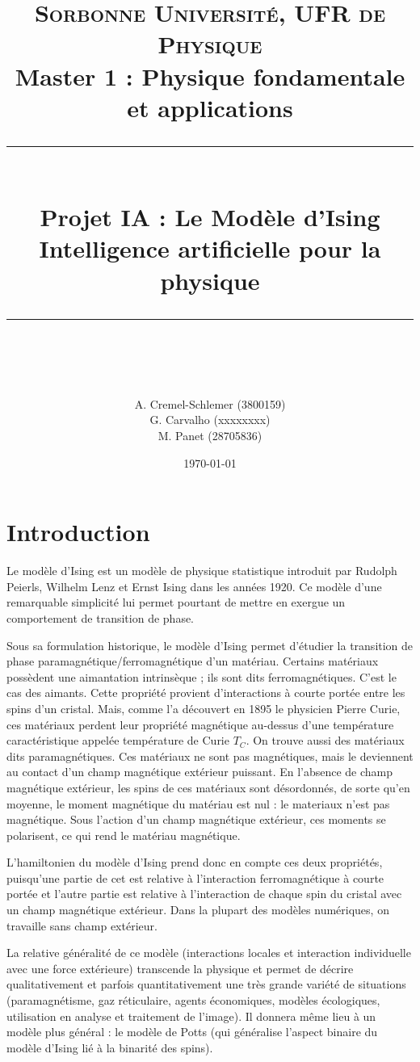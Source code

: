 \documentclass[11pt]{scrartcl} %
\title{	
	\normalfont\normalsize
	\large\textsc{Sorbonne Université, UFR de Physique}\\ %
	\vspace{2pt} %
	\normalsize Master 1 : Physique fondamentale et applications\\
	\vspace{25pt} %
	\rule{\linewidth}{0.5pt}\\ %
	\vspace{20pt} %
	{\huge Projet IA : Le Modèle d'Ising}\\ %
	\vspace{2pt} %
	{Intelligence artificielle pour la physique}\\
	\vspace{12pt} %
	\rule{\linewidth}{2pt}\\ %
	\vspace{12pt} %
}
\author{\LARGE A. Cremel-Schlemer \large (3800159) \\ \LARGE G. Carvalho \large (xxxxxxxx) \\ \LARGE M. Panet \large (28705836)} %
\date{\normalsize\today} %
\begin{document}
\maketitle %
\tableofcontents %

\newpage

\section*{Introduction}

Le modèle d'Ising est un modèle de physique statistique introduit par Rudolph Peierls, Wilhelm Lenz et Ernst Ising dans les années 1920. Ce modèle d'une remarquable simplicité lui permet pourtant de mettre en exergue un comportement de transition de phase. \par


Sous sa formulation historique, le modèle d'Ising permet d'étudier la transition de phase paramagnétique/ferromagnétique d'un matériau. 
Certains matériaux possèdent une aimantation intrinsèque ; ils sont dits ferromagnétiques. C'est le cas des aimants. Cette propriété provient d'interactions à courte portée entre les spins d'un cristal. Mais, comme l'a découvert en 1895 le physicien Pierre Curie, ces matériaux perdent leur propriété magnétique au-dessus d'une température caractéristique appelée température de Curie $T_C$.
On trouve aussi des matériaux dits paramagnétiques. Ces matériaux ne sont pas magnétiques, mais le deviennent au contact d'un champ magnétique extérieur puissant.
En l'absence de champ magnétique extérieur, les spins de ces matériaux sont désordonnés, de sorte qu'en moyenne, le moment magnétique du matériau est nul : le materiaux n'est pas magnétique. Sous l'action d'un champ magnétique extérieur, ces moments se polarisent, ce qui rend le matériau magnétique.

L'hamiltonien du modèle d'Ising prend donc en compte ces deux propriétés, puisqu'une partie de cet est relative à l'interaction ferromagnétique à courte portée et l'autre partie est relative à l'interaction de chaque spin du cristal avec un champ magnétique extérieur. 
Dans la plupart des modèles numériques, on travaille sans champ extérieur.


La relative généralité de ce modèle (interactions locales et interaction individuelle avec une force extérieure) transcende la physique et permet de décrire qualitativement et parfois quantitativement une très grande variété de situations (paramagnétisme, gaz réticulaire, agents économiques, modèles écologiques, utilisation en analyse et traitement de l'image). Il donnera même lieu à un modèle plus général : le modèle de Potts (qui généralise l'aspect binaire du modèle d'Ising lié à la binarité des spins).
\end{document}
